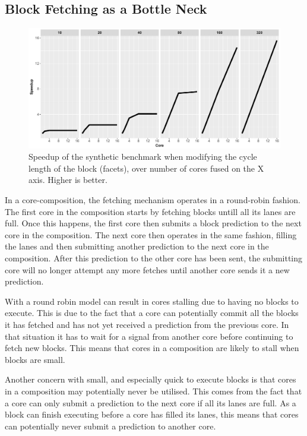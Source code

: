 \subsection{Block Fetching as a Bottle Neck}

\begin{figure}[h]
    \centering
    \includegraphics[width=1\textwidth]{chapter3/graphics/motivation_standard_fetch.pdf}

    \caption{Speedup of the synthetic benchmark when modifying the cycle length of the block (facets), over number of cores fused on the X axis. Higher is better.}
    \label{fig:block_graph}
\end{figure}

In a core-composition, the fetching mechanism operates in a round-robin fashion.
The first core in the composition starts by fetching blocks untill all its lanes are full.
Once this happens, the first core then submits a block prediction to the next core in the composition.
The next core then operates in the same fashion, filling the lanes and then submitting another prediction to the next core in the composition.
After this prediction to the other core has been sent, the submitting core will no longer attempt any more fetches until another core sends it a new prediction.

With a round robin model can result in cores stalling due to having no blocks to execute.
This is due to the fact that a core can potentially commit all the blocks it has fetched and has not yet received a prediction from the previous core.
In that situation it has to wait for a signal from another core before continuing to fetch new blocks.
This means that cores in a composition are likely to stall when blocks are small.

Another concern with small, and especially quick to execute blocks is that cores in a composition may potentially never be utilised.
This comes from the fact that a core can only submit a prediction to the next core if all its lanes are full.
As a block can finish executing before a core has filled its lanes, this means that cores can potentially never submit a prediction to another core.

